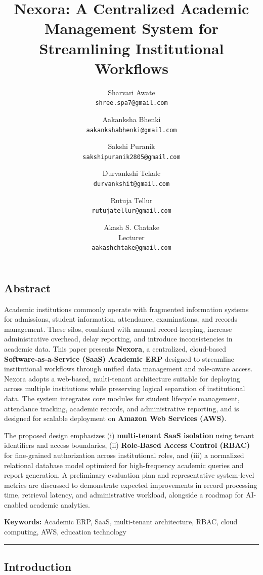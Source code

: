 \documentclass[11pt]{article}
\title{Nexora: A Centralized Academic Management System for Streamlining Institutional Workflows}
\author{%
  Sharvari Awate \\
  \texttt{shree.spa7@gmail.com}
  \and Aakanksha Bhenki \\
  \texttt{aakankshabhenki@gmail.com}
  \and Sakshi Puranik \\
  \texttt{sakshipuranik2805@gmail.com}
  \and Durvankshi Tekale \\
  \texttt{durvankshit@gmail.com}
  \and Rutuja Tellur \\
  \texttt{rutujatellur@gmail.com}
  \and Akash S. Chatake \\
  Lecturer\\[0.1cm]
  \small\texttt{aakashchtake@gmail.com}
}
\date{}
\begin{document}
\maketitle

\subsection{Abstract}\label{abstract}

Academic institutions commonly operate with fragmented information
systems for admissions, student information, attendance, examinations,
and records management. These silos, combined with manual
record-keeping, increase administrative overhead, delay reporting, and
introduce inconsistencies in academic data. This paper presents
\textbf{Nexora}, a centralized, cloud-based
\textbf{Software-as-a-Service (SaaS) Academic ERP} designed to
streamline institutional workflows through unified data management and
role-aware access. Nexora adopts a web-based, multi-tenant architecture
suitable for deploying across multiple institutions while preserving
logical separation of institutional data. The system integrates core
modules for student lifecycle management, attendance tracking, academic
records, and administrative reporting, and is designed for scalable
deployment on \textbf{Amazon Web Services (AWS)}.

The proposed design emphasizes (i) \textbf{multi-tenant SaaS isolation}
using tenant identifiers and access boundaries, (ii) \textbf{Role-Based
Access Control (RBAC)} for fine-grained authorization across
institutional roles, and (iii) a normalized relational database model
optimized for high-frequency academic queries and report generation. A
preliminary evaluation plan and representative system-level metrics are
discussed to demonstrate expected improvements in record processing
time, retrieval latency, and administrative workload, alongside a
roadmap for AI-enabled academic analytics.

\textbf{Keywords:} Academic ERP, SaaS, multi-tenant architecture, RBAC,
cloud computing, AWS, education technology

\begin{center}\rule{0.5\linewidth}{0.5pt}\end{center}

\subsection{Introduction}\label{introduction}
\end{document}
